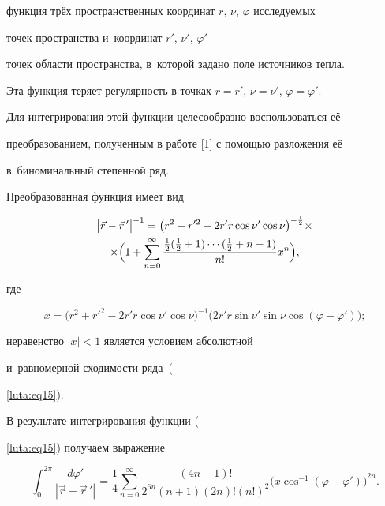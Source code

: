 {{{{{{функция трёх пространственных координат $r$, $\nu$, $\varphi $ исследуемых

точек пространства и~координат $r'$, $\nu '$, $\varphi '$

точек области пространства, в~которой задано поле источников тепла.

Эта функция теряет регулярность в точках $r=r'$, $\nu =\nu '$, $\varphi =\varphi '$.

Для интегрирования этой функции целесообразно воспользоваться её

преобразованием, полученным в работе [1] с помощью разложения её

в~биноминальный степенной ряд.

Преобразованная функция имеет вид

\begin{multline}

\label{luta:eq15}

\bigl| \vec {r}-\vec {r}\,' \bigr|^{-1}=

\bigl(r^2+r'^2-2r'r\cos \nu '\cos \nu \bigr)^{-\frac12} \times \\

\times

\Bigl( 1+

\sum\limits_{n=0}^\infty

\frac{\frac12(\frac12+1)\cdots(\frac12+n-1)}{n!}x^n  \Bigr),

\end{multline}

где

$$

x=\bigl(r^2+r'^2-2r'r\cos \nu '\cos \nu \bigr)^{-1}

\bigl(2r'r\sin \nu '\sin \nu \cos (\varphi -\varphi ') \bigr);$$

неравенство $| x |<1$ является условием абсолютной

и~равномерной сходимости ряда~({\ref{luta:eq15}).



В результате интегрирования функции ({\ref{luta:eq15}) получаем выражение

\begin{equation}

\label{luta:eq16}

\int_0^{2\pi }

\frac{d\varphi '}{| \vec {r}-\vec r\,' |}=

\frac14

\sum\limits_{n=0}^\infty

\frac{(4n+1)!}{2^{6n}(n+1)(2n)!(n!)^2}\bigl(x\cos ^{-1}(\varphi -\varphi')\bigr)^{2n}.


\end{equation}}}}}}}}}
